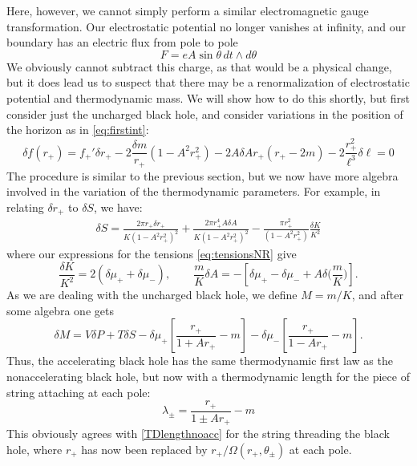 \documentclass[
twoside,
openright,
frontopenright,
]{dmathesis}
\begin{document}
Here, however, we cannot simply perform a similar electromagnetic
gauge transformation. Our electrostatic potential no longer
vanishes at infinity, and our boundary has an electric flux from pole to pole
\begin{equation}
F = eA \sin\theta \, dt \wedge d\theta
\end{equation}
We obviously cannot subtract this charge, as that would be a physical change,
but it does lead us to suspect that there may be a renormalization of
electrostatic potential and thermodynamic mass. We will show how to do this
shortly, but first consider just the uncharged black hole, and consider
variations in the position of the horizon as in \cref{eq:firstint}:
\begin{equation}
\delta f(r_+) = f_+' \delta r_+  - 2 \frac{\delta m}{r_+} (1-A^2r_+^2)
- 2 A \delta A r_+ (r_+ - 2m) - 2 \frac{r_+^2}{\ell^3} \delta \ell = 0
\end{equation}
The procedure is similar to the previous section, but we now have
more algebra involved in the variation of the thermodynamic parameters.
For example, in relating $\delta r_+$ to $\delta S$, we have:
\begin{align}
\delta S = \frac{2\pi r_+ \delta r_+}{K(1-A^2 r_+^2)^2} + 
\frac{2 \pi r_+^4 A\delta A}{K (1-A^2 r_+^2)^2} - 
\frac{\pi r_+^2}{(1-A^2 r_+^2)} \frac{\delta K}{K^2}
\end{align}
where our expressions for the tensions \cref{eq:tensionsNR} give
\begin{equation}
\frac{\delta K}{K^2} = 2 \left ( \delta \mu_+ + \delta \mu_- \right ), \qquad \frac{m}{K} \delta A = - \left [
\delta \mu_+ - \delta \mu_- + A \delta \Big(\frac{m}{K}\Big) \right].
\end{equation}
As we are dealing with the uncharged black hole, we define $M=m/K$, and after some
algebra one gets
\begin{equation}
\delta M = V\delta P + T \delta S -
\delta \mu_+ \left [ \frac{r_+}{1+Ar_+} - m \right ] -
\delta \mu_- \left [ \frac{r_+}{1-Ar_+} - m \right ] .
\label{firstaccm}
\end{equation}
Thus, the accelerating black hole has the same thermodynamic first law
as the nonaccelerating black hole, but now with a thermodynamic length
for the piece of string attaching at each pole:
\begin{equation}
\lambda_\pm = \frac{r_+}{1 \pm Ar_+} - m
\end{equation}
This obviously agrees with \cref{TDlengthnoacc} for the string
threading the black hole, where $r_+$ has now been replaced by
$r_+/\Omega(r_+,\theta_\pm)$ at each pole.
\end{document}
